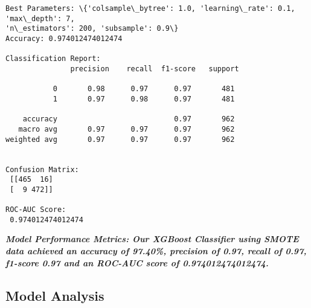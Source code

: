 \documentclass[11pt]{article}
\begin{document}
    \begin{Verbatim}[commandchars=\\\{\}]
Best Parameters: \{'colsample\_bytree': 1.0, 'learning\_rate': 0.1, 'max\_depth': 7,
'n\_estimators': 200, 'subsample': 0.9\}
Accuracy: 0.974012474012474

Classification Report:
               precision    recall  f1-score   support

           0       0.98      0.97      0.97       481
           1       0.97      0.98      0.97       481

    accuracy                           0.97       962
   macro avg       0.97      0.97      0.97       962
weighted avg       0.97      0.97      0.97       962


Confusion Matrix:
 [[465  16]
 [  9 472]]

ROC-AUC Score:
 0.974012474012474
    \end{Verbatim}

    \textbf{\emph{Model Performance Metrics: Our XGBoost Classifier using
SMOTE data achieved an accuracy of 97.40\%, precision of 0.97, recall of
0.97, f1-score 0.97 and an ROC-AUC score of 0.974012474012474.}}

    \subsection{Model Analysis}\label{model-analysis}
\end{document}
